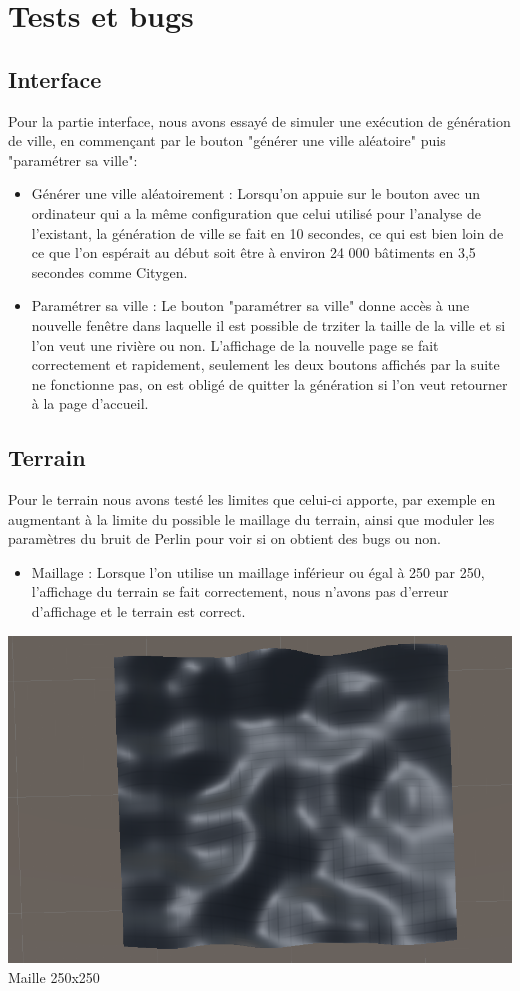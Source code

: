 \section{Tests et bugs}

\subsection{Interface}

Pour la partie interface, nous avons essayé de simuler une exécution de génération de ville, en commençant par le bouton "générer une ville aléatoire" puis "paramétrer sa ville":

\begin{itemize}
	\item Générer une ville aléatoirement : Lorsqu'on appuie sur le bouton avec un ordinateur qui a la même configuration que celui utilisé pour l'analyse de l'existant, la génération de ville se fait en 10 secondes, ce qui est bien loin de ce que l'on espérait au début soit être à environ 24 000 bâtiments en 3,5 secondes comme Citygen.
	\item Paramétrer sa ville : Le bouton "paramétrer sa ville" donne accès à une nouvelle fenêtre dans laquelle il est possible de trziter la taille de la ville et si l'on veut une rivière ou non. L'affichage de la nouvelle page se fait correctement et rapidement, seulement les deux boutons affichés par la suite ne fonctionne pas, on est obligé de quitter la génération si l'on veut retourner à la page d'accueil.
\end{itemize}

\subsection{Terrain}

Pour le terrain nous avons testé les limites que celui-ci apporte, par exemple en augmentant à la limite du possible le maillage du terrain, ainsi que moduler les paramètres du bruit de Perlin pour voir si on obtient des bugs ou non.

\begin{itemize}
	\item Maillage : Lorsque l'on utilise un maillage inférieur ou égal à 250 par 250, l'affichage du terrain se fait correctement, nous n'avons pas d'erreur d'affichage et le terrain est correct.
\end{itemize}
	
\begin{center}
	\centering
    \includegraphics[height = 5 cm]{images/maille(250x250).png}\\
	 \small{Maille 250x250}
\end{center}

